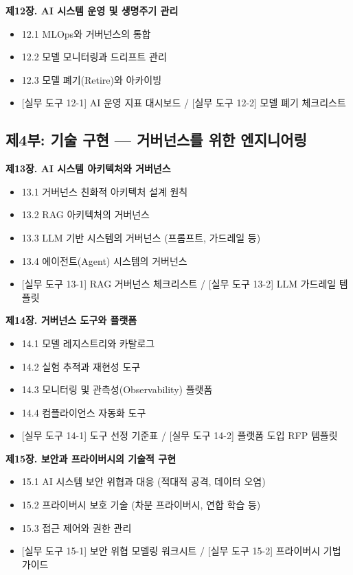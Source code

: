 \medskip
\textbf{제12장. AI 시스템 운영 및 생명주기 관리}
\begin{itemize}
 \item 12.1 MLOps와 거버넌스의 통합
 \item 12.2 모델 모니터링과 드리프트 관리
 \item 12.3 모델 폐기(Retire)와 아카이빙
 \item {[실무 도구 12-1] AI 운영 지표 대시보드} / {[실무 도구 12-2] 모델 폐기 체크리스트}
\end{itemize}

\vspace{0.5cm}
\subsection*{제4부: 기술 구현 --- 거버넌스를 위한 엔지니어링}

\textbf{제13장. AI 시스템 아키텍처와 거버넌스}
\begin{itemize}
 \item 13.1 거버넌스 친화적 아키텍처 설계 원칙
 \item 13.2 RAG 아키텍처의 거버넌스
 \item 13.3 LLM 기반 시스템의 거버넌스 (프롬프트, 가드레일 등)
 \item 13.4 에이전트(Agent) 시스템의 거버넌스
 \item {[실무 도구 13-1] RAG 거버넌스 체크리스트} / {[실무 도구 13-2] LLM 가드레일 템플릿}
\end{itemize}

\medskip
\textbf{제14장. 거버넌스 도구와 플랫폼}
\begin{itemize}
 \item 14.1 모델 레지스트리와 카탈로그
 \item 14.2 실험 추적과 재현성 도구
 \item 14.3 모니터링 및 관측성(Observability) 플랫폼
 \item 14.4 컴플라이언스 자동화 도구
 \item {[실무 도구 14-1] 도구 선정 기준표} / {[실무 도구 14-2] 플랫폼 도입 RFP 템플릿}
\end{itemize}

\medskip
\textbf{제15장. 보안과 프라이버시의 기술적 구현}
\begin{itemize}
 \item 15.1 AI 시스템 보안 위협과 대응 (적대적 공격, 데이터 오염)
 \item 15.2 프라이버시 보호 기술 (차분 프라이버시, 연합 학습 등)
 \item 15.3 접근 제어와 권한 관리
 \item {[실무 도구 15-1] 보안 위협 모델링 워크시트} / {[실무 도구 15-2] 프라이버시 기법 가이드}
\end{itemize}

